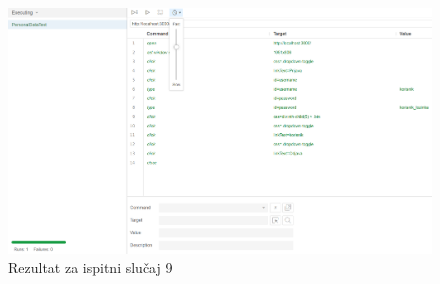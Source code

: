 				\begin{figure}[H]
            					\includegraphics[scale=0.5]{dokumentacija/slike/selenium/PersonalDataTest.png}
            					\centering
            					\caption{Rezultat za ispitni slučaj 9}
            					\label{fig:test 9}
            		            \end{figure}
			\clearpage

